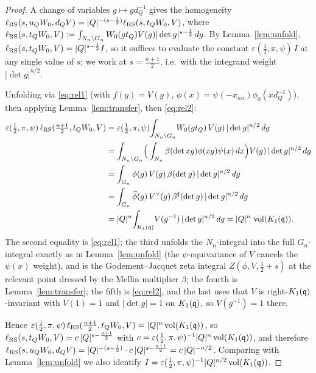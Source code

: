 \begin{proof}
A change of variables $g\mapsto g d_Q^{-1}$ gives the homogeneity
$\ell_{\mathrm{RS}}(s,u_Q W_0,d_Q V)=|Q|^{-(s-\frac12)}\ell_{\mathrm{RS}}(s,t_Q W_0,V)$, where
$\ell_{\mathrm{RS}}(s,t_Q W_0,V):=\int_{N_n\backslash G_n}W_0(g t_Q)V(g)|\det g|^{s-\frac12}\,dg$.
By Lemma~\ref{lem:unfold}, $\ell_{\mathrm{RS}}(s,t_Q W_0,V)=|Q|^{s-\frac12}I$, so it suffices to
evaluate the constant $\varepsilon(\tfrac12,\pi,\psi)\,I$ at any single value of $s$; we work
at $s=\tfrac{n+1}{2}$, i.e.\ with the integrand weight $|\det g|^{n/2}$.

Unfolding via \eqref{eq:rel1} (with $f(g)=V(g)$, $\phi(x)=\psi(-x_{nn})\phi_0(x d_Q^{-1})$),
then applying Lemma~\ref{lem:transfer}, then \eqref{eq:rel2}:
\begin{align*}
\varepsilon(\tfrac12,\pi,\psi)\,\ell_{\mathrm{RS}}(\tfrac{n+1}{2},t_Q W_0,V)
&=\varepsilon(\tfrac12,\pi,\psi)\!\int_{N_n\backslash G_n}\!W_0(g t_Q)\,V(g)\,|\det g|^{n/2}\,dg\\
&=\int_{N_n\backslash G_n}\!\Big(\int_{N_n}\beta(\det xg)\phi(xg)\psi(x)\,dx\Big)V(g)\,|\det g|^{n/2}\,dg\\
&=\int_{G_n}\phi(g)\,V(g)\,\beta(\det g)\,|\det g|^{n/2}\,dg\\
&=\int_{G_n}\widehat\phi(g)\,V^\vee(g)\,\beta^\sharp(\det g)\,|\det g|^{n/2}\,dg\\
&=|Q|^n\!\int_{K_1(\mathfrak{q})}\!V(g^{-1})\,|\det g|^{n/2}\,dg
=|Q|^n\,\operatorname{vol}(K_1(\mathfrak{q})).
\end{align*}
The second equality is \eqref{eq:rel1}; the third unfolds the $N_n$-integral into the full
$G_n$-integral exactly as in Lemma~\ref{lem:unfold} (the $\psi$-equivariance of $V$ cancels the
$\psi(x)$ weight), and is the Godement--Jacquet zeta integral $Z(\phi,V,\tfrac12+s)$ at the relevant
point dressed by the Mellin multiplier $\beta$; the fourth is Lemma~\ref{lem:transfer}; the fifth is
\eqref{eq:rel2}, and the last uses that $V$ is right-$K_1(\mathfrak{q})$-invariant with $V(1)=1$ and
$|\det g|=1$ on $K_1(\mathfrak{q})$, so $V(g^{-1})=1$ there.

Hence $\varepsilon(\tfrac12,\pi,\psi)\,\ell_{\mathrm{RS}}(\tfrac{n+1}{2},t_Q W_0,V)=|Q|^n\operatorname{vol}(K_1(\mathfrak{q}))$,
so $\ell_{\mathrm{RS}}(s,t_Q W_0,V)=c\,|Q|^{s-\frac{n+1}{2}}$ with $c=\varepsilon(\tfrac12,\pi,\psi)^{-1}
|Q|^n\operatorname{vol}(K_1(\mathfrak{q}))$, and therefore $\ell_{\mathrm{RS}}(s,u_Q W_0,d_Q V)=|Q|^{-(s-\frac12)}\cdot
c\,|Q|^{s-\frac{n+1}{2}}=c\,|Q|^{-n/2}$. Comparing with Lemma~\ref{lem:unfold} we also identify
$I=\varepsilon(\tfrac12,\pi,\psi)^{-1}|Q|^{n/2}\operatorname{vol}(K_1(\mathfrak{q}))$.
\end{proof}

